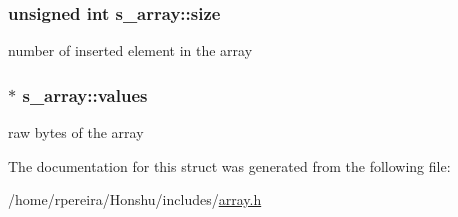 \subsubsection[{\texorpdfstring{size}{size}}]{\setlength{\rightskip}{0pt plus 5cm}unsigned int s\+\_\+array\+::size}\hypertarget{structs__array_a819453b38ad73825737ef6fe300fd309}{}\label{structs__array_a819453b38ad73825737ef6fe300fd309}
number of inserted element in the array 
\subsubsection[{\texorpdfstring{values}{values}}]{$\ast$ s\+\_\+array\+::values}\hypertarget{structs__array_ab4b5430249c910887c7c9012b267449d}{}\label{structs__array_ab4b5430249c910887c7c9012b267449d}
raw bytes of the array 

The documentation for this struct was generated from the following file\+:\begin{DoxyCompactItemize}
\item 
/home/rpereira/\+Honshu/includes/\hyperlink{array_8h}{array.\+h}\end{DoxyCompactItemize}
